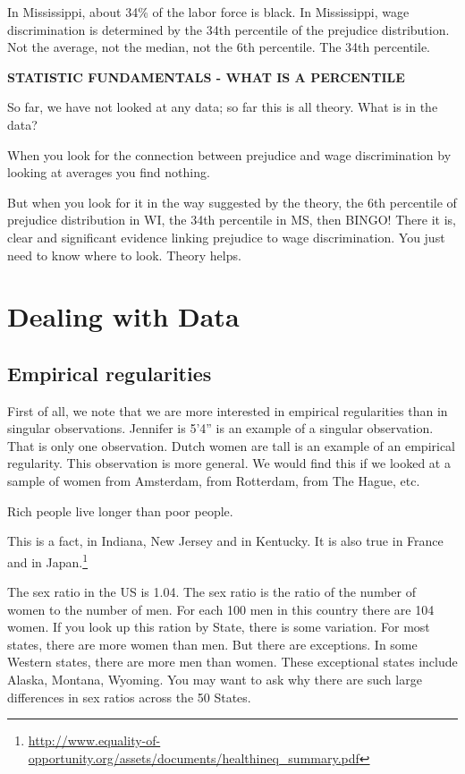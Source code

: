 \documentclass[
]{book}
\begin{document}
In Mississippi, about 34\% of the labor force is black. In Mississippi, wage discrimination is determined by the 34th percentile of the prejudice distribution. Not the average, not the median, not the 6th percentile. The 34th percentile.

\textbf{STATISTIC FUNDAMENTALS - WHAT IS A PERCENTILE}

So far, we have not looked at any data; so far this is all theory.
What is in the data?

When you look for the connection between prejudice and wage discrimination by looking at averages you find nothing.

But when you look for it in the way suggested by the theory, the 6th percentile of prejudice distribution in WI, the 34th percentile in MS, then BINGO! There it is, clear and significant evidence linking prejudice to wage discrimination. You just need to know where to look. Theory helps.

\hypertarget{dealing-with-data}{%
\section{Dealing with Data}\label{dealing-with-data}}

\hypertarget{empirical-regularities}{%
\subsection{Empirical regularities}\label{empirical-regularities}}

First of all, we note that we are more interested in empirical regularities than in singular observations. Jennifer is 5'4'' is an example of a singular observation. That is only one observation. Dutch women are tall is an example of an empirical regularity. This observation is more general. We would find this if we looked at a sample of women from Amsterdam, from Rotterdam, from The Hague, etc.

Rich people live longer than poor people.

This is a fact, in Indiana, New Jersey and in Kentucky. It is also true in France and in Japan.\footnote{\url{http://www.equality-of-opportunity.org/assets/documents/healthineq_summary.pdf}}

The sex ratio in the US is 1.04. The sex ratio is the ratio of the number of women to the number of men. For each 100 men in this country there are 104 women. If you look up this ration by State, there is some variation. For most states, there are more women than men. But there are exceptions. In some Western states, there are more men than women. These exceptional states include Alaska, Montana, Wyoming. You may want to ask why there are such large differences in sex ratios across the 50 States.
\end{document}
